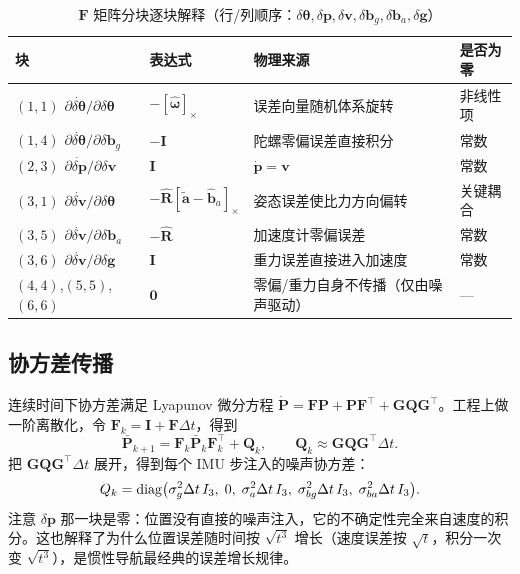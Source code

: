 \begin{table}[htbp]
  \centering
  \caption{$\bm{F}$ 矩阵分块逐块解释（行/列顺序：$\delta\bm{\theta},\delta\bm{p},\delta\bm{v},\delta\bm{b}_g,\delta\bm{b}_a,\delta\bm{g}$）}\label{tab:17-F}
  \footnotesize
  \begin{tabular}{llll}
    \toprule
    块 & 表达式 & 物理来源 & 是否为零 \\
    \midrule
    $(1,1)$ $\partial\dot{\delta\bm{\theta}}/\partial\delta\bm{\theta}$ & $-[\hat{\bm{\omega}}]_\times$ & 误差向量随机体系旋转 & 非线性项 \\
    $(1,4)$ $\partial\dot{\delta\bm{\theta}}/\partial\delta\bm{b}_g$ & $-\bm{I}$ & 陀螺零偏误差直接积分 & 常数 \\
    $(2,3)$ $\partial\dot{\delta\bm{p}}/\partial\delta\bm{v}$ & $\bm{I}$ & $\dot{\bm{p}}=\bm{v}$ & 常数 \\
    $(3,1)$ $\partial\dot{\delta\bm{v}}/\partial\delta\bm{\theta}$ & $-\hat{\bm{R}}[\tilde{\bm{a}}-\hat{\bm{b}}_a]_\times$ & 姿态误差使比力方向偏转 & 关键耦合 \\
    $(3,5)$ $\partial\dot{\delta\bm{v}}/\partial\delta\bm{b}_a$ & $-\hat{\bm{R}}$ & 加速度计零偏误差 & 常数 \\
    $(3,6)$ $\partial\dot{\delta\bm{v}}/\partial\delta\bm{g}$ & $\bm{I}$ & 重力误差直接进入加速度 & 常数 \\
    $(4,4)$,$(5,5)$,$(6,6)$ & $\bm{0}$ & 零偏/重力自身不传播（仅由噪声驱动） & --- \\
    \bottomrule
  \end{tabular}
\end{table}

\subsection{协方差传播}

连续时间下协方差满足 Lyapunov 微分方程 $\dot{\bm{P}}=\bm{F}\bm{P}+\bm{P}\bm{F}^{\top}+\bm{G}\bm{Q}\bm{G}^{\top}$。工程上做一阶离散化，令 $\bm{F}_k=\bm{I}+\bm{F}\Delta t$，得到
\begin{equation}\label{eq:17-cov-prop}
  \bar{\bm{P}}_{k+1}=\bm{F}_k\bar{\bm{P}}_k\bm{F}_k^{\top}+\bm{Q}_k,\qquad
  \bm{Q}_k\approx\bm{G}\bm{Q}\bm{G}^{\top}\Delta t.
\end{equation}
把 $\bm{G}\bm{Q}\bm{G}^{\top}\Delta t$ 展开，得到每个 IMU 步注入的噪声协方差：
\begin{equation}\label{eq:17-Qd}
  Q_k=\operatorname{diag}\bigl(\sigma_g^2\Delta t\,I_3,\;0,\;\sigma_a^2\Delta t\,I_3,\;\sigma_{bg}^2\Delta t\,I_3,\;\sigma_{ba}^2\Delta t\,I_3\bigr).
\end{equation}
注意 $\delta\bm{p}$ 那一块是零：位置没有直接的噪声注入，它的不确定性完全来自速度的积分。这也解释了为什么位置误差随时间按 $\sqrt{t^3}$ 增长（速度误差按 $\sqrt{t}$，积分一次变 $\sqrt{t^3}$），是惯性导航最经典的误差增长规律。

